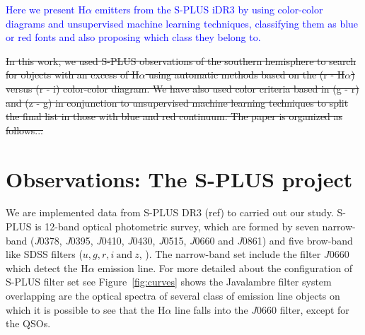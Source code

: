 \documentclass[fleqn,usenatbib]{mnras}
\newcommand{\rlopes}[1]{\textcolor{blue}{#1}}
\newcommand{\comment}[1]{\textcolor{red}{#1}}
\begin{document}

\rlopes{Here we present H$\alpha$ emitters from the S-PLUS iDR3 by using color-color diagrams and unsupervised machine learning techniques, classifying them as blue or red fonts and also proposing which class they belong to.}

\sout{In this work, we used S-PLUS observations of the southern hemisphere to search
for objects with an excess of H{$\alpha$} using automatic methods based on the
(r - H$\alpha$) versus (r - i) color-color diagram. We have also used color criteria
based in (g - r) and (z - g) in conjunction to unsupervised machine learning
techniques to split the final list in those with blue and red continuum. The
paper is organized as follows...}

\section{Observations: The S-PLUS project}
\label{sec:obser}

We are implemented data from S-PLUS DR3 (ref) to carried out our
study. S-PLUS is 12-band optical photometric survey, which are formed by
seven narrow-band (\textit{J}0378, \textit{J}0395, \textit{J}0410, \textit{J}0430,
\textit{J}0515, \textit{J}0660 and \textit{J}0861) and five brow-band like
SDSS filters (\(u, g, r, i~\mathrm{and}~z\), \citealp{Fukugita:1996}).
The narrow-band set include the filter $J$0660 which detect
the H{$\alpha$} emission line. For more detailed about the configuration of
S-PLUS filter set see Figure~\ref{fig:curves} shows the Javalambre filter
system \citep{Martin-Franch:2012} overlapping are the optical spectra of
several class of emission line objects on which it is possible to see that the
H{$\alpha$} line falls into the $J$0660 filter, except for the QSOs.   
\end{document}
